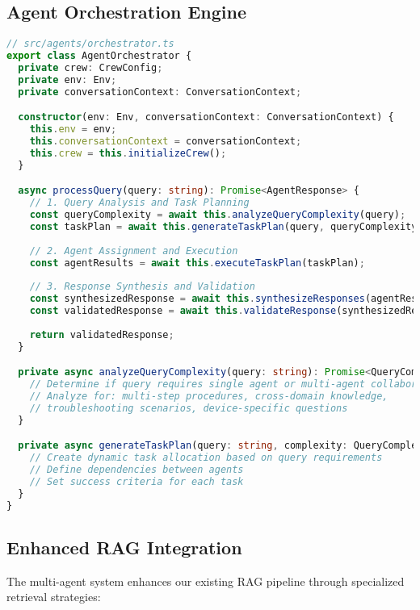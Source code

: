 \documentclass[11pt, a4paper]{article}
\begin{document}
\subsection{Agent Orchestration Engine}

\begin{lstlisting}[language=TypeScript, caption=Multi-Agent Orchestration Core]
// src/agents/orchestrator.ts
export class AgentOrchestrator {
  private crew: CrewConfig;
  private env: Env;
  private conversationContext: ConversationContext;

  constructor(env: Env, conversationContext: ConversationContext) {
    this.env = env;
    this.conversationContext = conversationContext;
    this.crew = this.initializeCrew();
  }

  async processQuery(query: string): Promise<AgentResponse> {
    // 1. Query Analysis and Task Planning
    const queryComplexity = await this.analyzeQueryComplexity(query);
    const taskPlan = await this.generateTaskPlan(query, queryComplexity);
    
    // 2. Agent Assignment and Execution
    const agentResults = await this.executeTaskPlan(taskPlan);
    
    // 3. Response Synthesis and Validation
    const synthesizedResponse = await this.synthesizeResponses(agentResults);
    const validatedResponse = await this.validateResponse(synthesizedResponse);
    
    return validatedResponse;
  }

  private async analyzeQueryComplexity(query: string): Promise<QueryComplexity> {
    // Determine if query requires single agent or multi-agent collaboration
    // Analyze for: multi-step procedures, cross-domain knowledge, 
    // troubleshooting scenarios, device-specific questions
  }

  private async generateTaskPlan(query: string, complexity: QueryComplexity): Promise<TaskPlan> {
    // Create dynamic task allocation based on query requirements
    // Define dependencies between agents
    // Set success criteria for each task
  }
}
\end{lstlisting}

\subsection{Enhanced RAG Integration}

The multi-agent system enhances our existing RAG pipeline through specialized retrieval strategies:
\end{document}
